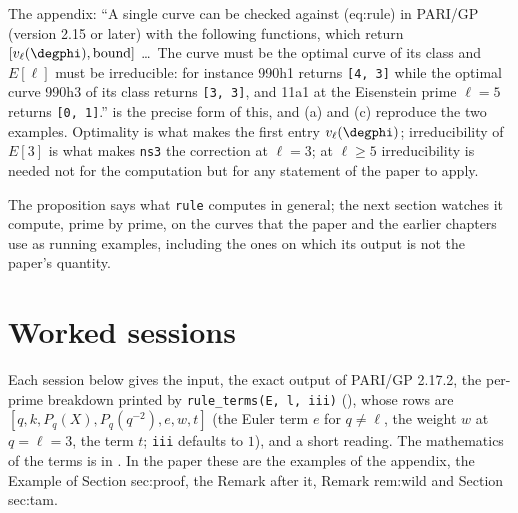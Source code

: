 \begin{sloppypar}
\begin{paperlink}\label{pl:computation:rule}
The appendix: ``A single curve can be checked against (eq:rule) in PARI/GP (version 2.15 or later) with the following functions, which
return $[v_\ell(\degphi),\text{bound}]$ \dots\ The curve must be the optimal curve of its class and $E[\ell]$ must be irreducible: for instance
990h1 returns \texttt{[4, 3]} while the optimal curve 990h3 of its class returns \texttt{[3, 3]}, and 11a1 at the Eisenstein prime $\ell=5$ returns
\texttt{[0, 1]}.''  is the precise form of this, and (a) and (c) reproduce
the two examples. Optimality is what makes the first entry $v_\ell(\degphi)$; irreducibility of $E[3]$ is what makes \texttt{ns3} the correction at
$\ell=3$; at $\ell\ge5$ irreducibility is needed not for the computation but for any statement of the paper to apply.
\end{paperlink}

The proposition says what \texttt{rule} computes in general; the next section watches it compute, prime by prime, on the curves that the paper
and the earlier chapters use as running examples, including the ones on which its output is not the paper's quantity.

\section{Worked sessions}\label{sec:computation:sessions}

Each session below gives the input, the exact output of PARI/GP 2.17.2, the per-prime breakdown printed by \texttt{rule\_terms(E, l, iii)}
(), whose rows are $[q,\allowbreak k,\allowbreak P_q(X),\allowbreak P_q(q^{-2}),\allowbreak e,w,t]$ (the Euler term $e$ for $q\ne\ell$, the weight $w$ at $q=\ell=3$,
the term $t$; \texttt{iii} defaults to $1$), and a short reading. The mathematics of the terms is in . In the paper
these are the examples of the appendix, the Example of Section sec:proof, the Remark after it, Remark rem:wild and Section sec:tam.


\end{sloppypar}

